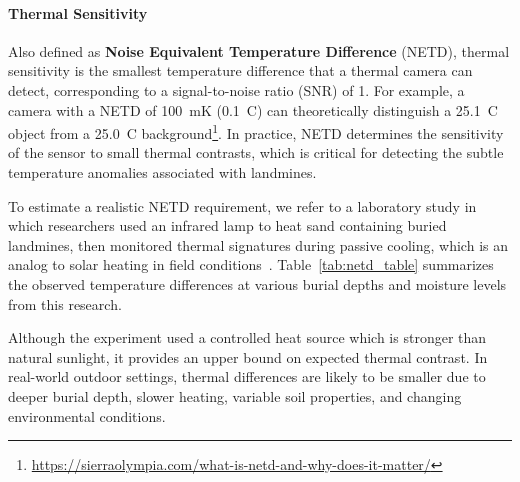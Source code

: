 \paragraph{Thermal Sensitivity}

Also defined as \textbf{Noise Equivalent Temperature Difference} (NETD), thermal sensitivity is the smallest temperature difference that a thermal camera can detect, corresponding to a signal-to-noise ratio (SNR) of 1. For example, a camera with a NETD of 100~mK (0.1~\textdegree C) can theoretically distinguish a 25.1~\textdegree C object from a 25.0~\textdegree C background\footnote{\url{https://sierraolympia.com/what-is-netd-and-why-does-it-matter/}}. In practice, NETD determines the sensitivity of the sensor to small thermal contrasts, which is critical for detecting the subtle temperature anomalies associated with landmines.

To estimate a realistic NETD requirement, we refer to a laboratory study in which researchers used an infrared lamp to heat sand containing buried landmines, then monitored thermal signatures during passive cooling, which is an analog to solar heating in field conditions~\cite{lamorski2002thermal}. Table~\ref{tab:netd_table} summarizes the observed temperature differences at various burial depths and moisture levels from this research.

Although the experiment used a controlled heat source which is stronger than natural sunlight, it provides an upper bound on expected thermal contrast. In real-world outdoor settings, thermal differences are likely to be smaller due to deeper burial depth, slower heating, variable soil properties, and changing environmental conditions.

